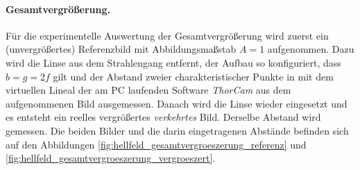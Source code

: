 \documentclass[ngerman]{scrartcl}
\begin{document}
\paragraph{Gesamtvergrößerung.}
Für die experimentelle Auswertung der Gesamtvergrößerung wird zuerst ein (unvergrößertes) Referenzbild mit Abbildungsmaßstab $A=1$ aufgenommen. Dazu wird die Linse aus dem Strahlengang entfernt, der Aufbau so konfiguriert, dass $b=g=2f$ gilt und der Abstand zweier charakteristischer Punkte in \si{\px} mit dem virtuellen Lineal der am PC laufenden Software \textit{ThorCam\texttrademark{}} aus dem aufgenommenen Bild ausgemessen. Danach wird die Linse wieder eingesetzt und es entsteht ein reelles vergrößertes \emph{verkehrtes} Bild. Derselbe Abstand wird gemessen. Die beiden Bilder und die darin eingetragenen Abstände befinden sich auf den Abbildungen \ref{fig:hellfeld_gesamtvergroeszerung_referenz} und \ref{fig:hellfeld_gesamtvergroeszerung_vergroeszert}.
%
\setcapindent{0pt}
\end{document}
